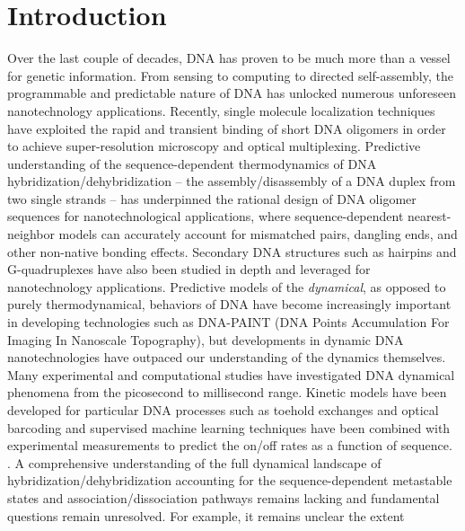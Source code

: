 \documentclass[journal=jpcbfk,manuscript=article]{achemso}
\begin{document}

\newpage

\section{\label{sec:intro}Introduction}

Over the last couple of decades, DNA has proven to be much more than a vessel for genetic information. From sensing to computing to directed self-assembly, the programmable and predictable nature of DNA has unlocked numerous unforeseen nanotechnology applications.\citep{Seeman2017DNANanotechnology, Adleman1994MolecularProblems, Rothemund2006FoldingPatterns, Gu2010ALine} Recently, single molecule localization techniques have exploited the rapid and transient binding of short DNA oligomers in order to achieve super-resolution microscopy and optical multiplexing. \cite{Schnitzbauer2017Super-resolutionDNA-PAINT, Shah2019, Strauss2020UpDNA-PAINT} Predictive understanding of the sequence-dependent thermodynamics of DNA hybridization/dehybridization -- the assembly/disassembly of a DNA duplex from two single strands -- has underpinned the rational design of DNA oligomer sequences for nanotechnological applications, where sequence-dependent nearest-neighbor models can accurately account for mismatched pairs, dangling ends, and other non-native bonding effects.\citep{SantaLucia1998AThermodynamics, Santalucia2004TheMotifs} Secondary DNA structures such as hairpins and G-quadruplexes have also been studied in depth and leveraged for nanotechnology applications.\citep{Tsukanov2013DetailedOrigami, Mosayebi2014TheFormation, Mergny2019DNANanotechnology} Predictive models of the \textit{dynamical}, as opposed to purely thermodynamical, behaviors of DNA have become increasingly important in developing technologies such as DNA-PAINT (DNA Points Accumulation For Imaging In Nanoscale Topography), but developments in dynamic DNA nanotechnologies have outpaced our understanding of the dynamics themselves. \citep{Deluca2020DynamicDevices, Cordes2010SensingTransfer, Naimark2020DNADevelopment} Many experimental and computational studies have investigated DNA dynamical phenomena from the picosecond to millisecond range.\citep{Yin2011KineticsHybridization, Xiao2019, Hinckley2014Coarse-grainedEffects, Sanstead2016, Porschke1971CooperativeTransition} Kinetic models have been developed for particular DNA processes such as toehold exchanges and optical barcoding \citep{Zhang2009ControlExchange, Shah2019ProgrammingFingerprinting} and supervised machine learning techniques have been combined with experimental measurements to predict the on/off rates as a function of sequence. \citep{Schickinger2018TetheredHelices, Zhang2018PredictingSequence, Shah2019}. A comprehensive understanding of the full dynamical landscape of hybridization/dehybridization accounting for the sequence-dependent metastable states and association/dissociation pathways remains lacking and fundamental questions remain unresolved. For example, it remains unclear the extent 
\end{document}

